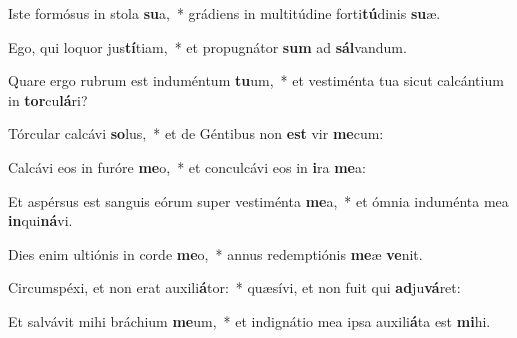 \item Iste formósus in stola \textbf{su}a,~* grádiens in multitúdine forti\textbf{tú}dinis \textbf{su}æ.
\item Ego, qui loquor jus\textbf{tí}tiam,~* et propugnátor \textbf{sum} ad \textbf{sál}vandum.
\item Quare ergo rubrum est induméntum \textbf{tu}um,~* et vestiménta tua sicut calcántium in \textbf{tor}cu\textbf{lá}ri?
\item Tórcular calcávi \textbf{so}lus,~* et de Géntibus non \textbf{est} vir \textbf{me}cum:
\item Calcávi eos in furóre \textbf{me}o,~* et conculcávi eos in \textbf{i}ra \textbf{me}a:
\item Et aspérsus est sanguis eórum super vestiménta \textbf{me}a,~* et ómnia induménta mea \textbf{in}qui\textbf{ná}vi.
\item Dies enim ultiónis in corde \textbf{me}o,~* annus redemptiónis \textbf{me}æ \textbf{ve}nit.
\item Circumspéxi, et non erat auxili\textbf{á}tor:~* quæsívi, et non fuit qui \textbf{ad}ju\textbf{vá}ret:
\item Et salvávit mihi bráchium \textbf{me}um,~* et indignátio mea ipsa auxili\textbf{á}ta est \textbf{mi}hi.
